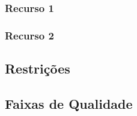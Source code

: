 


\subsubsection{Recurso 1}

\subsubsection{Recurso 2}

\subsection{Restrições}

\subsection{Faixas de Qualidade}

